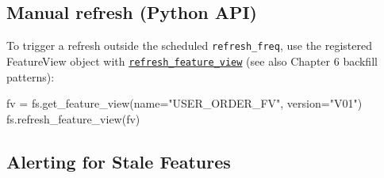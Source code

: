 \documentclass[
  letterpaper,
  DIV=11,
  numbers=noendperiod]{scrreprt}
\newenvironment{Shaded}{\begin{snugshade}}{\end{snugshade}}
\newcommand{\CommentTok}[1]{\textcolor[rgb]{0.37,0.37,0.37}{#1}}
\newcommand{\ControlFlowTok}[1]{\textcolor[rgb]{0.00,0.23,0.31}{#1}}
\newcommand{\DecValTok}[1]{\textcolor[rgb]{0.68,0.00,0.00}{#1}}
\newcommand{\FunctionTok}[1]{\textcolor[rgb]{0.28,0.35,0.67}{#1}}
\newcommand{\KeywordTok}[1]{\textcolor[rgb]{0.00,0.23,0.31}{#1}}
\newcommand{\NormalTok}[1]{\textcolor[rgb]{0.00,0.23,0.31}{#1}}
\newcommand{\OperatorTok}[1]{\textcolor[rgb]{0.37,0.37,0.37}{#1}}
\newcommand{\StringTok}[1]{\textcolor[rgb]{0.13,0.47,0.30}{#1}}
\begin{document}
\hypertarget{manual-refresh-python-api}{%
\subsection{Manual refresh (Python
API)}\label{manual-refresh-python-api}}

To trigger a refresh outside the scheduled \texttt{refresh\_freq}, use
the registered FeatureView object with
\href{https://docs.snowflake.com/en/developer-guide/snowflake-ml/feature-store/overview}{\texttt{refresh\_feature\_view}}
(see also Chapter 6 backfill patterns):

\begin{Shaded}
\begin{Highlighting}[]
\NormalTok{fv }\OperatorTok{=}\NormalTok{ fs.get\_feature\_view(name}\OperatorTok{=}\StringTok{"USER\_ORDER\_FV"}\NormalTok{, version}\OperatorTok{=}\StringTok{"V01"}\NormalTok{)}
\NormalTok{fs.refresh\_feature\_view(fv)}
\end{Highlighting}
\end{Shaded}

\hypertarget{alerting-for-stale-features}{%
\subsection{Alerting for Stale
Features}\label{alerting-for-stale-features}}

\begin{Shaded}
\end{Shaded}
\end{document}
